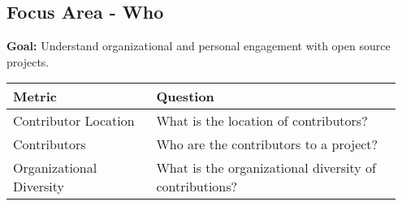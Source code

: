 
\subsection{Focus Area - Who}
\textbf{Goal:} Understand organizational and personal engagement with open source projects.
\begin{table}[ht]
	\centering
	\begin{tabular}{| p{0.35\linewidth} | p{0.6\linewidth} |}
		\hline
		\hfil \textbf{Metric}  & \hfil \textbf{Question} \\ 
		\hline		
		Contributor Location & What is the location of contributors? \\
		\hline
		Contributors & Who are the contributors to a project? \\
		\hline
		Organizational Diversity & What is the organizational diversity of contributions? \\
		\hline
	\end{tabular}
\end{table}












